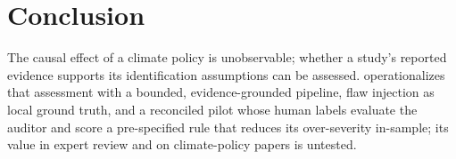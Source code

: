 \section{Conclusion}
\label{sec:conclusion}

The causal effect of a climate policy is unobservable; whether a study's
reported evidence supports its identification assumptions can be assessed.
\sys{} operationalizes that assessment with a bounded, evidence-grounded
pipeline, flaw injection as local ground truth, and a reconciled pilot whose human labels evaluate the auditor and score a
pre-specified rule that reduces its over-severity in-sample; its value
in expert review and on climate-policy papers is untested.

